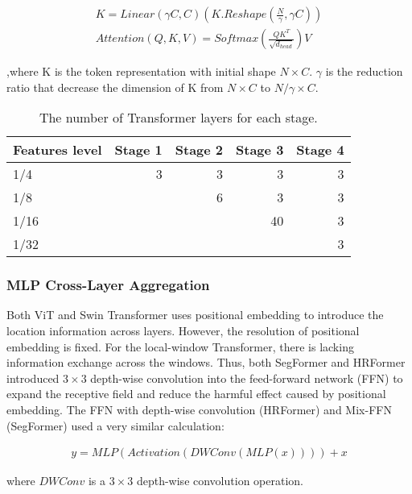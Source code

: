 \documentclass{article}
\begin{document}
\begin{align}
    K = Linear(\gamma C, C)(K.Reshape(\frac{N}{\gamma}, \gamma C)) \\
    Attention(Q, K, V) = Softmax(\frac{QK^{T}}{\sqrt{d_{head}}})V
\end{align}

,where K is the token representation with initial shape $N \times C$. $\gamma$ is the reduction ratio that decrease the dimension of K from $N \times C$ to $N/\gamma \times C$.




\begin{table}
\centering
\begin{tabular}{lrrrr}
\toprule
Features level  & Stage 1 & Stage 2 & Stage 3 & Stage 4 \\
\midrule
1/4 & 3  & 3    & 3 & 3      \\
1/8 &   & 6 & 3 & 3       \\
1/16    &   &   & 40    & 3      \\
1/32    &   &   &   & 3      \\
\bottomrule
\end{tabular}
\caption{The number of Transformer layers for each stage.}
\label{tab:transformer_blocks}
\end{table}


\subsubsection{MLP Cross-Layer Aggregation}

Both ViT and Swin Transformer uses positional embedding to introduce the location information across layers. However, the resolution of positional embedding is fixed. For the local-window Transformer, there is lacking information exchange across the windows. Thus, both SegFormer and HRFormer introduced $3 \times 3$ depth-wise convolution into the feed-forward network (FFN) to expand the receptive field and reduce the harmful effect caused by positional embedding. The FFN with depth-wise convolution (HRFormer) and Mix-FFN (SegFormer) used a very similar calculation:

\begin{align}
    y = MLP(Activation(DWConv(MLP(x)))) + x
\end{align}

where $DWConv$ is a $3 \times 3$ depth-wise convolution operation.
\end{document}
